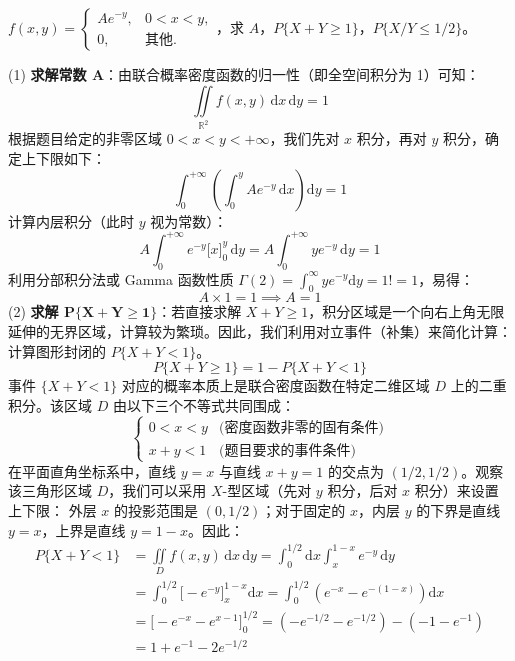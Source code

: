 ﻿\documentclass[lang=cn,11pt]{elegantbook}
\begin{document}
\begin{exercise}[概率计算] \label{exer:3-c12}
$f(x,y) = \begin{cases} Ae^{-y}, & 0 < x < y, \\ 0, & \text{其他}. \end{cases}$，求 $A$，$P\{X+Y \geqslant 1\}$，$P\{X/Y \leqslant 1/2\}$。
\end{exercise}
\begin{solution}
(1) \textbf{求解常数 $\boldsymbol{A}$}：由联合概率密度函数的归一性（即全空间积分为 1）可知：
\[
\iint\limits_{\mathbb{R}^2} f(x,y) \,\mathrm{d}x\,\mathrm{d}y = 1
\]
根据题目给定的非零区域 $0 < x < y < +\infty$，我们先对 $x$ 积分，再对 $y$ 积分，确定上下限如下：
\[
\int_{0}^{+\infty} \left( \int_{0}^{y} A e^{-y} \,\mathrm{d}x \right) \mathrm{d}y = 1
\]
计算内层积分（此时 $y$ 视为常数）：
\[
A \int_{0}^{+\infty} e^{-y} \Big[ x \Big]_{0}^{y} \,\mathrm{d}y = A \int_{0}^{+\infty} y e^{-y} \,\mathrm{d}y = 1
\]
利用分部积分法或 Gamma 函数性质 $\Gamma(2) = \int_0^\infty y e^{-y} \mathrm{d}y = 1! = 1$，易得：
\[
A \times 1 = 1 \implies A = 1
\]
(2) \textbf{求解 $\boldsymbol{P\{X+Y \geqslant 1\}}$}：若直接求解 $X+Y \geqslant 1$，积分区域是一个向右上角无限延伸的无界区域，计算较为繁琐。因此，我们利用对立事件（补集）来简化计算：计算图形封闭的 $P\{X+Y < 1\}$。
\[
P\{X+Y \geqslant 1\} = 1 - P\{X+Y < 1\}
\]
事件 $\{X+Y < 1\}$ 对应的概率本质上是联合密度函数在特定二维区域 $D$ 上的二重积分。该区域 $D$ 由以下三个不等式共同围成：
\[
\begin{cases}
0 < x < y & \text{(密度函数非零的固有条件)} \\
x + y < 1 & \text{(题目要求的事件条件)}
\end{cases}
\]
在平面直角坐标系中，直线 $y = x$ 与直线 $x + y = 1$ 的交点为 $(1/2, 1/2)$。观察该三角形区域 $D$，我们可以采用 $X$-型区域（先对 $y$ 积分，后对 $x$ 积分）来设置上下限：
外层 $x$ 的投影范围是 $(0, 1/2)$；对于固定的 $x$，内层 $y$ 的下界是直线 $y=x$，上界是直线 $y=1-x$。因此：
\begin{align*}
P\{X+Y < 1\} &= \iint\limits_{D} f(x,y) \,\mathrm{d}x\,\mathrm{d}y = \int_{0}^{1/2} \mathrm{d}x \int_{x}^{1-x} e^{-y} \,\mathrm{d}y \\
&= \int_{0}^{1/2} \Big[ -e^{-y} \Big]_{x}^{1-x} \mathrm{d}x = \int_{0}^{1/2} \left( e^{-x} - e^{-(1-x)} \right) \mathrm{d}x \\
&= \Big[ -e^{-x} - e^{x-1} \Big]_{0}^{1/2} = \left( -e^{-1/2} - e^{-1/2} \right) - \left( -1 - e^{-1} \right) \\
&= 1 + e^{-1} - 2e^{-1/2}
\end{align*}

\end{solution}
\end{document}
